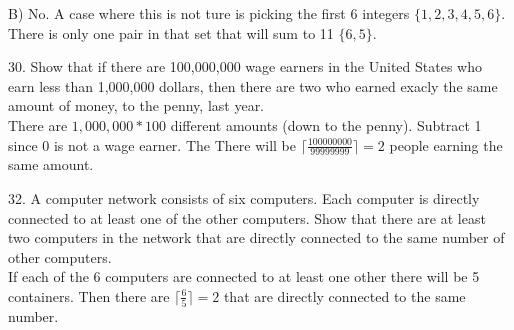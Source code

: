 \documentclass[12]{article}
\begin{document}
B) No. A case where this is not ture is picking the first 6 integers $\{1,2,3,4,5,6\}$.  There is only one pair in that set that will sum to 11 $\{6,5\}$.\\


\hrulefill


30. Show that if there are 100,000,000 wage earners in the United States who earn less than
1,000,000 dollars, then there are two who earned exacly the same amount of money, to the
penny, last year.\\

There are $1,000,000 * 100$ different amounts (down to the penny).  Subtract 1 since 0 is not a wage earner.  The There will be $\lceil\frac{100000000}{99999999}\rceil = 2$ people earning the same amount.\\

\hrulefill

32. A computer network consists of six computers. Each computer is directly connected to at least one of the other computers. Show that there are at least two computers in the network that are directly connected to the same number of other computers.\\

If each of the 6 computers are connected to at least one other there will be 5 containers.  Then there are $\lceil\frac{6}{5}\rceil = 2$ that are directly connected to the same number. 
\end{document}
